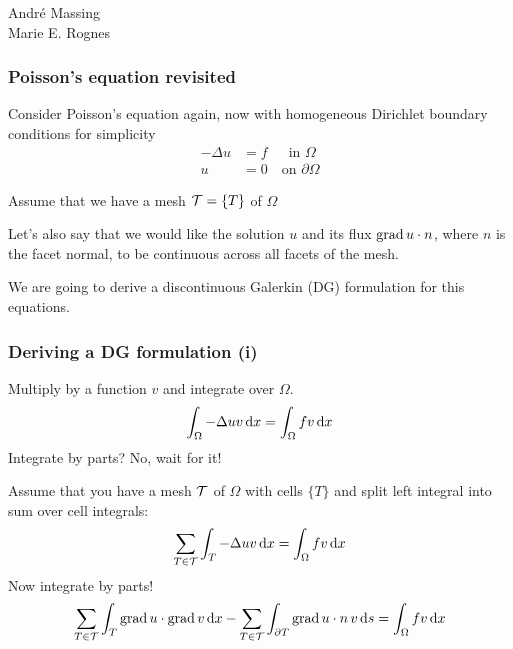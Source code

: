 \documentclass{fenicscourse}
\begin{document}
              {Andr\'e Massing \\ Marie E. Rognes}







\begin{frame}
\frametitle{Poisson's equation revisited}

  Consider Poisson's equation again, now with homogeneous Dirichlet
  boundary conditions for simplicity
  \begin{equation*}
    \begin{split}
      - \Delta u &= f \,\,\, \quad \mbox{in } \Omega
      \\
      u &= 0 \quad \mbox{on } \partial \Omega
    \end{split}
  \end{equation*}

  \bigskip

  Assume that we have a mesh $\mathcal{T} = \{ T \}$ of $\Omega$

  \bigskip

  Let's also say that we would like the \alert{solution} $u$ and its
  \alert{flux} $\operatorname{\mathrm{grad}} u \cdot n$, where $n$ is the facet normal, to be
  \alert{continuous} across all facets of the mesh.

  \bigskip

  We are going to derive a discontinuous Galerkin (DG) formulation for
  this equations.

\end{frame}

\begin{frame}
  \frametitle{Deriving a DG formulation (i)}

  Multiply by a function $v$ and integrate over $\Omega$.
  \begin{equation*}
    \int_{\Omega} - \Delta u v \, \mathrm{d}x = \int_{\Omega} f v \, \mathrm{d}x
  \end{equation*}
  Integrate by parts? No, wait for it!

  \bigskip

  Assume that you have a mesh $\mathcal{T}$ of $\Omega$ with cells $\{T\}$
  and split left integral into sum over cell integrals:
  \begin{equation*}
    \sum_{T \in \mathcal{T} } \int_{T} - \Delta u v \, \mathrm{d}x = \int_{\Omega} f v \, \mathrm{d}x
  \end{equation*}
  Now integrate by parts!
  \begin{equation*}
    \sum_{T \in \mathcal{T} } \int_{T} \operatorname{\mathrm{grad}} u \cdot \operatorname{\mathrm{grad}} v \, \mathrm{d}x
    - \sum_{T \in \mathcal{T} } \int_{\partial T} \operatorname{\mathrm{grad}} u \cdot n \, v \, \mathrm{d}s
    = \int_{\Omega} f v \, \mathrm{d}x
  \end{equation*}
\end{frame}
\end{document}
